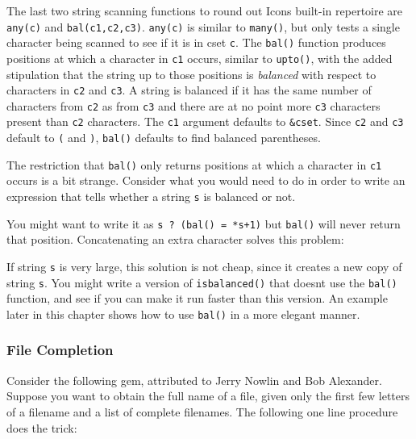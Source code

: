 The last two string scanning functions to round out
Icon{\textquotesingle}s built-in repertoire are
\texttt{any(c)} and \texttt{bal(c1,c2,c3)}.
\texttt{any(c)} is similar to \texttt{many()}, but only tests a single
character being scanned to see if it is in cset \texttt{c}. The
\texttt{bal()} function produces positions at which a character in
\texttt{c1} occurs, similar to \texttt{upto()}, with the added
stipulation that the string up to those positions is \textit{balanced}
with respect to characters in \texttt{c2} and \texttt{c3}. A string is
balanced if it has the same number of characters from \texttt{c2} as
from \texttt{c3} and there are at no point more \texttt{c3} characters
present than \texttt{c2} characters. The \texttt{c1} argument defaults
to \texttt{\&cset}. Since \texttt{c2} and \texttt{c3} default to
\texttt{{\textquotesingle}({\textquotesingle}} and
\texttt{{\textquotesingle}){\textquotesingle}}, \texttt{bal()} defaults
to find balanced parentheses.

The restriction that \texttt{bal()} only returns positions at which a
character in \texttt{c1} occurs is a bit strange. Consider what you
would need to do in order to write an expression that tells whether a
string \texttt{s} is balanced or not.

You might want to write it as \texttt{s ? (bal() = *s+1)} but
\texttt{bal()} will never return that position. Concatenating an extra
character solves this problem:


If string \texttt{s} is very large, this solution is not cheap, since it
creates a new copy of string \texttt{s}. You might write a version of
\texttt{isbalanced()} that doesn{\textquotesingle}t use the
\texttt{bal()} function, and see if you can make it run faster than
this version. An example later in this chapter shows how to use
\texttt{bal()} in a more elegant manner.

\subsubsection{File Completion}

Consider the following gem, attributed to Jerry Nowlin and Bob Alexander. Suppose you want
to obtain the full name of a file, given only the first few letters of
a filename and a list of complete filenames.
The following one line procedure does the trick:

